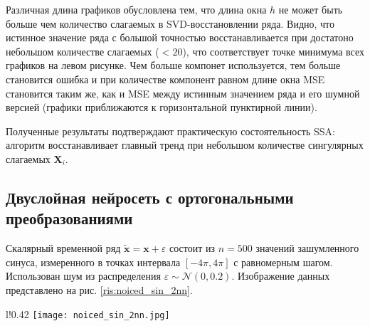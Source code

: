 \documentclass[12pt, twoside]{article}
\begin{document}
\begin{figure}[ht]%
    \centering
    \label{fig:ssa_mse}%
    \qquad
    \label{fig:ssa_mape}%
\end{figure}

Различная длина графиков обусловлена тем, что длина окна $h$ не может быть больше чем количество слагаемых в SVD-восстановлении ряда. Видно, что истинное значение ряда с большой точностью восстанавливается при достатоно небольшом количестве слагаемых ($<20$), что соответствует точке минимума всех графиков на левом рисунке. Чем больше компонет используется, тем больше становится ошибка и при количестве компонент равном длине окна MSE становится таким же, как и MSE между истинным значением ряда и его шумной версией (графики приближаются к горизонтальной пунктирной линии).


Полученные результаты подтверждают практическую состоятельность SSA: алгоритм восстанавливает главный тренд при небольшом количестве сингулярных слагаемых $\mathbf{X}_i$.


\subsection{Двуслойная нейросеть с ортогональными преобразованиями}
Скалярный временной ряд $\mathbf{\tilde{x}} = \mathbf{x} + \varepsilon$ состоит из $n=500$ значений зашумленного синуса, измеренного в точках интервала $[-4\pi, 4\pi]$ с равномерным шагом. Использован шум из распределения $\varepsilon \sim \mathcal{N}(0, 0.2)$. Изображение данных представлено на рис. \ref{ris:noiced_sin_2nn}.

\begin{wrapfigure}{l!}{0.42\textwidth}
\texttt{[image: noiced\_sin\_2nn.jpg]}
\caption{Зашумленный синус.}
\label{ris:noiced_sin_2nn}
\end{wrapfigure}
\end{document}
